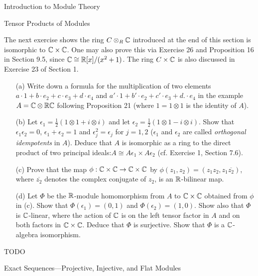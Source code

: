 \begin{chapter}{Introduction to Module Theory}
\begin{section}{Tensor Products of Modules}
\begin{problem}\label{ex:10.4.27}
The next exercise shows the ring $C\otimes _R\mathbb{C}$ introduced at the end of this section is isomorphic to $\mathbb{C}\times \mathbb{C}$. One may also prove this via Exercise 26 and Proposition 16 in Section 9.5, since $\mathbb{C}\cong \mathbb{R}[x]/(x^2+1)$. The ring $C\times \mathbb{C}$ is also discussed in Exercise 23 of Section 1.\begin{enumerate}
\item[(a)] Write down a formula for the multiplication of two elements $a\cdot 1 + b \cdot e_2+c\cdot e_3+d\cdot e_4$ and $a'\cdot 1 + b' \cdot e_2+c'\cdot e_3+d.\cdot e_4$ in the example $A=\mathbb{C}\otimes\mathbb{R}\mathbb{C}$ following Proposition 21 (where $1=1\otimes 1$ is the identity of $A$). 
\item[(b)] Let $\epsilon_1=\frac{1}{2}(1\otimes 1+i\otimes i)$ and let $\epsilon_2=\frac{1}{2}(1\otimes 1-i\otimes i)$. Show that $\epsilon_1\epsilon_2 = 0$, $\epsilon_1+\epsilon_2=1$ and $\epsilon_j^2=\epsilon_j$ for $j=1,2$ ($\epsilon_1$ and $\epsilon_2$ are called \emph{orthogonal idempotents} in $A$). Deduce that $A$ is isomorphic as a ring to the direct product of two principal ideals:$ A\cong A\epsilon_1\times A\epsilon_2$ (cf. Exercise 1, Section 7.6). 
\item[(c)] Prove that the map $\phi:\mathbb{C}\times \mathbb{C} \to \mathbb{C}\times\mathbb{C}$ by $\phi(z_1,z_2) = (z_1z_2,z_1\overline{z_2})$, where $\overline{z_2}$ denotes the complex conjugate of $z_2$, is an $\mathbb{R}$-bilinear map.
\item[(d)] Let $\Phi$ be the $\mathbb{R}$-module homomorphism from $A$ to $\mathbb{C}\times \mathbb{C}$ obtained from $\phi$ in (c). Show that $\Phi(\epsilon_1) = (0,1)$ and $\Phi(\epsilon_2)=(1,0)$. Show also that $\Phi$ is $\mathbb{C}$-linear, where the action of $\mathbb{C}$ is on the left tensor factor in $A$ and on both factors in $\mathbb{C}\times\mathbb{C}$. Deduce that $\Phi$ is surjective. Show that $\Phi$ is a $\mathbb{C}$-algebra isomorphism. 
 \end{enumerate} 
\end{problem}
\begin{solution}TODO

\end{solution}\oneperpage


\end{section}









\begin{section}{Exact Sequences---Projective, Injective, and Flat Modules}


\end{section}
\end{chapter}
